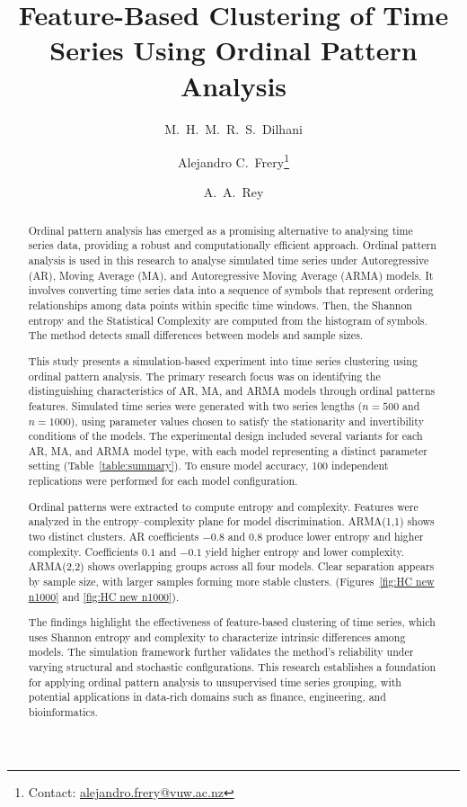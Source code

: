 \documentclass[11pt,a4paper]{article}
\title{\vspace{-1cm}Feature-Based Clustering of Time Series Using Ordinal Pattern Analysis\vspace{-0.3cm}}
\author[1]{M.\ H.\ M.\ R.\ S.\ Dilhani}
\author[1]{Alejandro C.\ Frery\thanks{Contact: \href{mailto:alejandro.frery@vuw.ac.nz}{alejandro.frery@vuw.ac.nz}}}
\author[2]{A.\ A.\ Rey}
\affil[1]{School of Mathematics and Statistics, Victoria University of Wellington, New Zealand}
\affil[2]{Laboratorio de Investigación y Desarrollo Experimental en Computación (LIDEC),\\
	Instituto de Tecnología e Ingeniería, Universidad Nacional de Hurlingham (UNAHUR), Argentina}
\date{}
\begin{document}
	\maketitle
	\vspace{-0.5cm}
	
	\begin{abstract}
	
	
Ordinal pattern analysis has emerged as a promising alternative to analysing time series data, providing a robust and computationally efficient approach. Ordinal pattern analysis is used in this research to analyse simulated time series under Autoregressive (AR), Moving Average (MA), and Autoregressive Moving Average (ARMA) models. It involves converting time series data into a sequence of symbols that represent ordering relationships among data points within specific time windows.  Then, the Shannon entropy and the Statistical Complexity are computed from the histogram of symbols. The method detects small differences between models and sample sizes.
	
This study presents a simulation-based experiment into time series clustering using ordinal pattern analysis. The primary research focus was on identifying the distinguishing characteristics of AR, MA, and ARMA models through ordinal patterns features. Simulated time series were generated with two series lengths ($n = 500$ and $n = 1000$), using parameter values chosen to satisfy the stationarity and invertibility conditions of the models. The experimental design included several variants for each AR, MA, and ARMA model type, with each model representing a distinct parameter setting (Table~\ref{table:summary}). To ensure model accuracy, 100 independent replications were performed for each model configuration.

Ordinal patterns were extracted to compute entropy and complexity. Features were analyzed in the entropy–complexity plane for model discrimination. ARMA(1,1) shows two distinct clusters. AR coefficients $-0.8$ and $0.8$ produce lower entropy and higher complexity. Coefficients $0.1$ and $-0.1$ yield higher entropy and lower complexity. ARMA(2,2) shows overlapping groups across all four models. Clear separation appears by sample size, with larger samples forming more stable clusters. (Figures~\ref{fig:HC new n1000} and \ref{fig:HC new n1000}).

The findings highlight the effectiveness of feature-based clustering of time series, which uses Shannon entropy and complexity to characterize intrinsic differences among models. The simulation framework further validates the method’s reliability under varying structural and stochastic configurations. This research establishes a foundation for applying ordinal pattern analysis to unsupervised time series grouping, with potential applications in data-rich domains such as finance, engineering, and bioinformatics.
	
\end{abstract}
\end{document}
